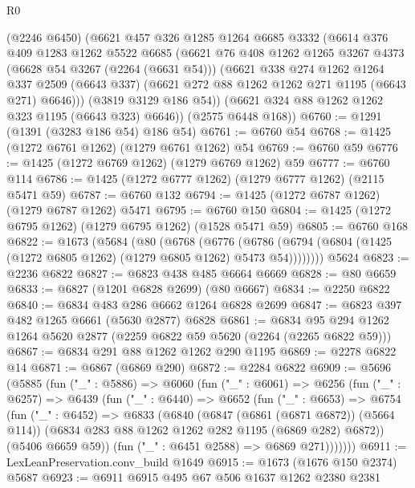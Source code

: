 \begin{lexlean}{R0}
\begin{coremodule}
      (@2246 @6450)
      (@6621
        @457
        @326
        @1285
        @1264
        @6685
        @3332
        (@6614
          @376
          @409
          @1283
          @1262
          @5522
          @6685
          (@6621
            @76
            @408
            @1262
            @1265
            @3267
            @4373
            (@6628 @54 @3267 (@2264 (@6631 @54)))
            (@6621
              @338
              @274
              @1262
              @1264
              @337
              @2509
              (@6643 @337)
              (@6621 @272 @88 @1262 @1262 @271 @1195 (@6643 @271) @6646)))
          (@3819 @3129 @186 @54))
        (@6621 @324 @88 @1262 @1262 @323 @1195 (@6643 @323) @6646))
      (@2575 @6448 @168))
@6760 := @1291 (@1391 (@3283 @186 @54) @186 @54)
@6761 := @6760 @54
@6768 := @1425 (@1272 @6761 @1262) (@1279 @6761 @1262) @54
@6769 := @6760 @59
@6776 := @1425 (@1272 @6769 @1262) (@1279 @6769 @1262) @59
@6777 := @6760 @114
@6786 := @1425 (@1272 @6777 @1262) (@1279 @6777 @1262) (@2115 @5471 @59)
@6787 := @6760 @132
@6794 := @1425 (@1272 @6787 @1262) (@1279 @6787 @1262) @5471
@6795 := @6760 @150
@6804 := @1425 (@1272 @6795 @1262) (@1279 @6795 @1262) (@1528 @5471 @59)
@6805 := @6760 @168
@6822 := @1673
    (@5684
      (@80
        (@6768
          (@6776
            (@6786 (@6794 (@6804 (@1425 (@1272 @6805 @1262) (@1279 @6805 @1262) @5473 @54))))))))
    @5624
@6823 := @2236 @6822
@6827 := @6823 @438 @485 @6664 @6669
@6828 := @80 @6659
@6833 := @6827 (@1201 @6828 @2699) (@80 @6667)
@6834 := @2250 @6822
@6840 := @6834 @483 @286 @6662 @1264 @6828 @2699
@6847 := @6823 @397 @482 @1265 @6661 (@5630 @2877) @6828
@6861 := @6834 @95 @294 @1262 @1264 @5620 @2877 (@2259 @6822 @59 @5620 (@2264 (@2265 @6822 @59)))
@6867 := @6834 @291 @88 @1262 @1262 @290 @1195
@6869 := @2278 @6822 @14
@6871 := @6867 (@6869 @290)
@6872 := @2284 @6822
@6909 := @5696
    (@5885
      (fun ("_" : @5886) =>
      @6060
        (fun ("_" : @6061) =>
        @6256
          (fun ("_" : @6257) =>
          @6439
            (fun ("_" : @6440) =>
            @6652
              (fun ("_" : @6653) =>
              @6754
                (fun ("_" : @6452) =>
                @6833
                  (@6840
                    (@6847 (@6861 (@6871 @6872)) (@5664 @114))
                    (@6834 @283 @88 @1262 @1262 @282 @1195 (@6869 @282) @6872))
                  (@5406 @6659 @59))
                (fun ("_" : @6451 @2588) => @6869 @271)))))))
@6911 := LexLeanPreservation.conv_build @1649
@6915 := @1673 (@1676 @150 @2374) @5687
@6923 := @6911 @6915 @495 @67 @506 @1637 @1262 @2380 @2381

\end{coremodule}
\end{lexlean}

